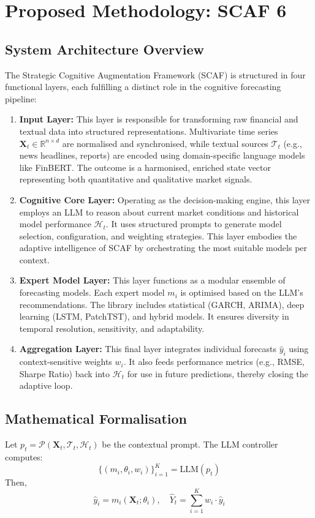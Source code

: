 \documentclass[conference]{IEEEtran}
\begin{document}
\section{Proposed Methodology: SCAF 6}

\subsection{System Architecture Overview}
The Strategic Cognitive Augmentation Framework (SCAF) is structured in four functional layers, each fulfilling a distinct role in the cognitive forecasting pipeline:
\begin{enumerate}
    \item \textbf{Input Layer:} This layer is responsible for transforming raw financial and textual data into structured representations. Multivariate time series $\mathbf{X}_t \in \mathbb{R}^{n \times d}$ are normalised and synchronised, while textual sources $\mathcal{T}_t$ (e.g., news headlines, reports) are encoded using domain-specific language models like FinBERT. The outcome is a harmonised, enriched state vector representing both quantitative and qualitative market signals.

    \item \textbf{Cognitive Core Layer:} Operating as the decision-making engine, this layer employs an LLM to reason about current market conditions and historical model performance $\mathcal{H}_t$. It uses structured prompts to generate model selection, configuration, and weighting strategies. This layer embodies the adaptive intelligence of SCAF by orchestrating the most suitable models per context.

    \item \textbf{Expert Model Layer:} This layer functions as a modular ensemble of forecasting models. Each expert model $m_i$ is optimised based on the LLM's recommendations. The library includes statistical (GARCH, ARIMA), deep learning (LSTM, PatchTST), and hybrid models. It ensures diversity in temporal resolution, sensitivity, and adaptability.

    \item \textbf{Aggregation Layer:} This final layer integrates individual forecasts $\hat{y}_i$ using context-sensitive weights $w_i$. It also feeds performance metrics (e.g., RMSE, Sharpe Ratio) back into $\mathcal{H}_t$ for use in future predictions, thereby closing the adaptive loop.
\end{enumerate}

\subsection{Mathematical Formalisation}
Let $p_t = \mathcal{P}(\mathbf{X}_t, \mathcal{T}_t, \mathcal{H}_t)$ be the contextual prompt. The LLM controller computes:
\[ \{(m_i, \theta_i, w_i)\}_{i=1}^K = \text{LLM}(p_t) \]
Then,
\[ \hat{y}_i = m_i(\mathbf{X}_t; \theta_i), \quad \hat{Y}_t = \sum_{i=1}^K w_i \cdot \hat{y}_i \]
\end{document}
